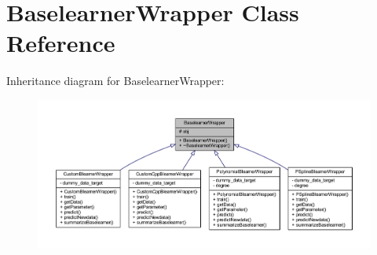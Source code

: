 \hypertarget{class_baselearner_wrapper}{}\section{Baselearner\+Wrapper Class Reference}
\label{class_baselearner_wrapper}


Inheritance diagram for Baselearner\+Wrapper\+:\nopagebreak
\begin{figure}[H]
\begin{center}
\leavevmode
\includegraphics[width=350pt]{class_baselearner_wrapper__inherit__graph}
\end{center}
\end{figure}


